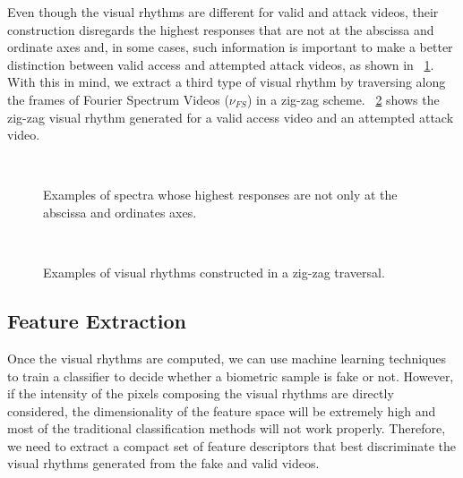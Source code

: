 \documentclass[journal]{IEEEtran}
\providecommand{\rrv}[1]{{\protect\color{black}{#1}}}
\begin{document}
Even though the visual rhythms are different for valid and attack videos, their construction disregards the highest responses that are not at the abscissa and ordinate axes and, in some cases, such information is important to make a better distinction between valid access and attempted attack videos, as shown in \rrv{Fig.}~\ref{fig:espectro}. With this in mind, we extract a third type of visual rhythm by traversing along the frames of Fourier Spectrum Videos ($\nu_{FS}$) in a zig-zag scheme. \rrv{Fig.}~\ref{fig:rvZigzag} shows the zig-zag visual rhythm generated for a valid access video and an attempted attack video.
%
\begin{figure}[!htb]
\centering
{}\hspace{1mm}
\\
\caption{Examples of spectra whose highest responses are not only at the abscissa and ordinates axes.}
\label{fig:espectro}
\end{figure}
%
\begin{figure}[!htb]
\centering
{}\hspace{1mm}
\\
\caption{Examples of visual rhythms constructed in a zig-zag traversal.}
\label{fig:rvZigzag}
\end{figure}

\subsection{Feature Extraction}
Once the visual rhythms are computed, we can use machine learning techniques to train a classifier to decide whether a biometric sample is fake or not. However, if the intensity of the pixels composing the visual rhythms are directly considered, the dimensionality of the feature space will be extremely high and most of the traditional classification methods will not work properly. Therefore, we need to extract a compact set of feature descriptors that best discriminate the visual rhythms generated from the fake and valid videos.
\end{document}
